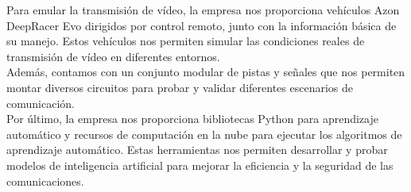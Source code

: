 Para emular la transmisión de vídeo, la empresa nos proporciona vehículos Azon DeepRacer Evo dirigidos por control remoto, junto con la información básica de su manejo. Estos vehículos nos permiten simular las condiciones reales de transmisión de vídeo en diferentes entornos.\\

Además, contamos con un conjunto modular de pistas y señales que nos permiten montar diversos circuitos para probar y validar diferentes escenarios de comunicación.\\

Por último, la empresa nos proporciona bibliotecas Python para aprendizaje automático y recursos de computación en la nube para ejecutar los algoritmos de aprendizaje automático. Estas herramientas nos permiten desarrollar y probar modelos de inteligencia artificial para mejorar la eficiencia y la seguridad de las comunicaciones.